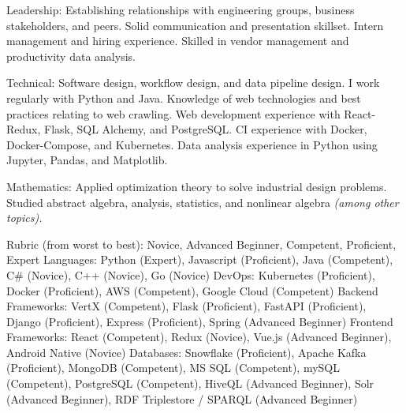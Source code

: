 \documentclass[10pt,a4paper]{article} %
\begin{document}
\inlineheadsection %
{Leadership:}
{Establishing relationships with engineering groups, business stakeholders, and peers. Solid communication and presentation skillset. Intern management and hiring experience. Skilled in vendor management and productivity data analysis.}


\inlineheadsection %
{Technical:}
{Software design, workflow design, and data pipeline design. I work regularly with Python and Java. Knowledge of web technologies and best practices relating to web crawling. Web development experience with React-Redux, Flask, SQL Alchemy, and PostgreSQL. CI experience with Docker, Docker-Compose, and Kubernetes. Data analysis experience in Python using Jupyter, Pandas, and Matplotlib.}


\inlineheadsection %
{Mathematics:}
{Applied optimization theory to solve industrial design problems. Studied abstract algebra, analysis, statistics, and nonlinear algebra \textit{(among other topics).}}


Rubric (from worst to best): Novice, Advanced Beginner, Competent, Proficient, Expert
\inlineheadsection %
{Languages:}
{Python (Expert), Javascript (Proficient), Java (Competent), C\# (Novice), C++ (Novice), Go (Novice)}
\inlineheadsection %
{DevOps:}
{Kubernetes (Proficient), Docker (Proficient), AWS (Competent), Google Cloud (Competent)}
\inlineheadsection %
{Backend Frameworks:}
{VertX (Competent), Flask (Proficient), FastAPI (Proficient), Django (Proficient), Express (Proficient), Spring (Advanced Beginner)}
\inlineheadsection %
{Frontend Frameworks:}
{React (Competent), Redux (Novice), Vue.js (Advanced Beginner), Android Native (Novice)}
\inlineheadsection %
{Databases:}
{Snowflake (Proficient), Apache Kafka (Proficient), MongoDB (Competent), MS SQL (Competent), mySQL (Competent), PostgreSQL (Competent), HiveQL (Advanced Beginner), Solr (Advanced Beginner), RDF Triplestore / SPARQL (Advanced Beginner)}

\spacedhrule{1.6em}{-0.4em} %

\end{document}
